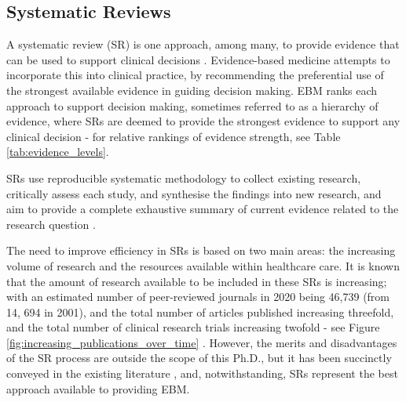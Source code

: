 \documentclass[../main.tex]{subfiles}
\begin{document}
\subsection{Systematic Reviews}

A systematic review (SR) is one approach, among many, to provide evidence that can be used to support clinical decisions \cite{kranke_evidence-based_2010}. Evidence-based medicine attempts to incorporate this into clinical practice, by recommending the preferential use of the strongest available evidence in guiding decision making. EBM ranks each approach to support decision making, sometimes referred to as a hierarchy of evidence, where SRs are deemed to provide the strongest evidence to support any clinical decision - for relative rankings of evidence strength, see Table \ref{tab:evidence_levels}.



SRs use reproducible systematic methodology to collect existing research, critically assess each study, and synthesise the findings into new research, and aim to provide a complete exhaustive summary of current evidence related to the research question \cite{noauthor_cochrane_nodate}. 

The need to improve efficiency in SRs is based on two main areas: the increasing volume of research and the resources available within healthcare care. It is known that the amount of research available to be included in these SRs is increasing; with an estimated number of peer-reviewed journals in 2020 being 46,739 (from 14, 694 in 2001), and the total number of articles published increasing threefold, and the total number of clinical research trials increasing twofold - see Figure \ref{fig:increasing_publications_over_time} \cite{ghasemi_scientific_2022}. However, the merits and disadvantages of the SR process are outside the scope of this Ph.D., but it has been succinctly conveyed in the existing literature \cite{howick_front_2011}, and, notwithstanding, SRs represent the best approach available to providing EBM.

\end{document}
